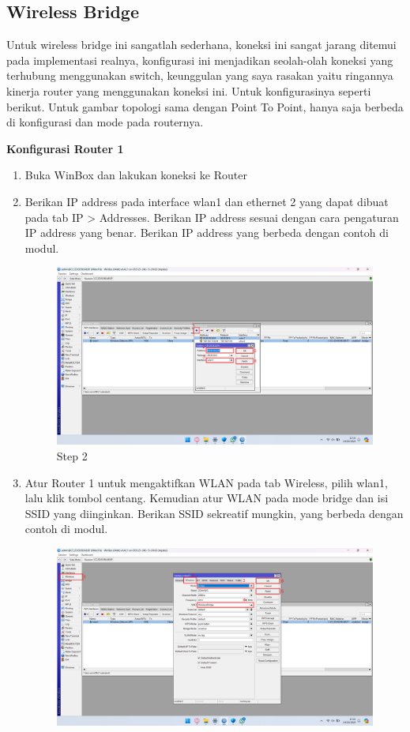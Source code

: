 \subsection{Wireless Bridge}
Untuk wireless bridge ini sangatlah sederhana, koneksi ini sangat jarang ditemui pada
implementasi realnya, konfigurasi ini menjadikan seolah-olah koneksi yang terhubung
menggunakan switch, keunggulan yang saya rasakan yaitu ringannya kinerja router yang
menggunakan koneksi ini. Untuk konfigurasinya seperti berikut.
Untuk gambar topologi sama dengan Point To Point, hanya saja berbeda di konfigurasi dan
mode pada routernya.
\begin{center}
	\textbf{Konfigurasi Router 1}
	\begin{enumerate}
		\item Buka WinBox dan lakukan koneksi ke Router
		\item Berikan IP address pada interface wlan1 dan ethernet 2 yang dapat dibuat pada tab IP > Addresses. Berikan IP address sesuai dengan cara pengaturan IP address yang benar. Berikan IP address yang berbeda dengan contoh di modul.
		\begin{figure}[H]
			\centering
			\includegraphics[width=0.9\linewidth]{P1/img/per3/pc1/Step 2.png}
			\caption{Step 2}
			\label{fig:Step 2(Per.3 PC1)}
		\end{figure}
		\item Atur Router 1 untuk mengaktifkan WLAN pada tab Wireless, pilih wlan1, lalu klik tombol centang. Kemudian atur WLAN pada mode bridge dan isi SSID yang diinginkan. Berikan SSID sekreatif mungkin, yang berbeda dengan contoh di modul.
		\begin{figure}[H]
			\centering
			\includegraphics[width=0.9\linewidth]{P1/img/per3/pc1/Step 3.png}

\end{figure}
\end{enumerate}
\end{center}
